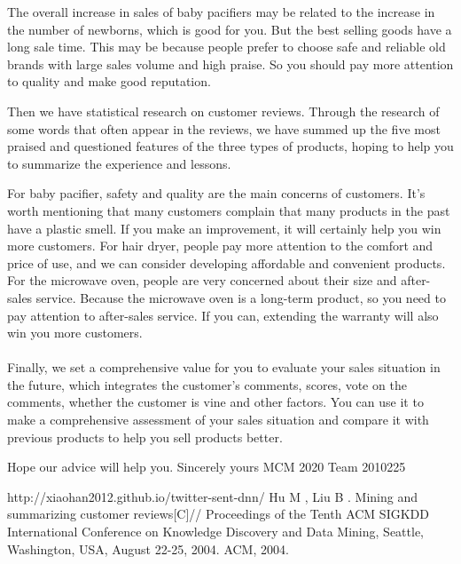 \documentclass{mcmthesis}
\begin{document}
	The overall increase in sales of baby pacifiers may be related to the increase in the number of newborns, which is good for you. But the best selling goods have a long sale time. This may be because people prefer to choose safe and reliable old brands with large sales volume and high praise. So you should pay more attention to quality and make good reputation.
	
	Then we have statistical research on customer reviews. Through the research of some words that often appear in the reviews, we have summed up the five most praised and questioned features of the three types of products, hoping to help you to summarize the experience and lessons.
	
	For baby pacifier, safety and quality are the main concerns of customers. It's worth mentioning that many customers complain that many products in the past have a plastic smell. If you make an improvement, it will certainly help you win more customers. For hair dryer, people pay more attention to the comfort and price of use, and we can consider developing affordable and convenient products. For the microwave oven, people are very concerned about their size and after-sales service. Because the microwave oven is a long-term product, so you need to pay attention to after-sales service. If you can, extending the warranty will also win you more customers.
	\paragraph{}
	Finally, we set a comprehensive value for you to evaluate your sales situation in the future, which integrates the customer's comments, scores, vote on the comments, whether the customer is vine and other factors. You can use it to make a comprehensive assessment of your sales situation and compare it with previous products to help you sell products better.
	
	Hope our advice will help you.
	\flushleft
	Sincerely yours
	\flushleft
	MCM 2020 Team 2010225
	
	\newpage
	
	\begin{thebibliography}{99}
		 http://xiaohan2012.github.io/twitter-sent-dnn/
		 Hu M , Liu B . Mining and summarizing customer reviews[C]// Proceedings of the Tenth ACM SIGKDD International Conference on Knowledge Discovery and Data Mining, Seattle, Washington, USA, August 22-25, 2004. ACM, 2004.
		
	\end{thebibliography}
	
\end{document}

